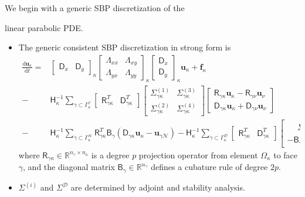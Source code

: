 \documentclass[final]{beamer}
\newlength{\firstcolwid}
\newcommand{\fnc}[1]{\ensuremath{\mathcal{#1}}}
\newcommand{\mat}[1]{\ensuremath{\mathsf{#1}}}
\newcommand{\mr}[1]{\mathrm{#1}}
\newcommand{\diff}[0]{\mr{d}}
\renewcommand{\H}[0]{\mat{H}}
\newcommand{\Hk}[0]{\H_{\kappa}}
\newcommand{\Dx}[0]{\mat{D}_{x}}
\newcommand{\Dy}[0]{\mat{D}_{y}}
\newcommand{\B}[0]{\mat{B}}
\newcommand{\Bg}[0]{\mat{B}_{\gamma}}
\newcommand{\Sig}[0]{\mat{\Sigma}}
\newcommand{\Lam}[0]{\mat{\Lambda}}
\newcommand{\Lamxx}[0]{\Lam_{xx}}
\newcommand{\Lamxy}[0]{\Lam_{xy}}
\newcommand{\Lamyx}[0]{\Lam_{yx}}
\newcommand{\Lamyy}[0]{\Lam_{yy}}
\newcommand{\Rgk}[0]{\mat{R}_{\gamma\kappa}}
\newcommand{\Rgn}[0]{\mat{R}_{\gamma\nu}}
\newcommand{\Dgk}[0]{\mat{D}_{\gamma\kappa}}
\newcommand{\Dgn}[0]{\mat{D}_{\gamma\nu}}
\newcommand{\Ukp}[0]{\bm{u}_\kappa}
\newcommand{\Unu}[0]{\bm{u}_\nu}
\newcommand{\Siggk}[1]{\Sig_{\gamma\kappa}^{(#1)}}
\newcommand{\phnt}[1]{\phantom{#1}}
\begin{document}
\begin{frame}[t]
\begin{columns}[t]
\begin{column}{\firstcolwid}
\begin{alertblock}{We begin with a generic SBP discretization of the 
        
        linear parabolic PDE.}
\begin{itemize}
    \item The generic consistent SBP discretization in strong form is
    \small
    \begin{equation*}\label{eq:parabolic_SBP}
    \begin{aligned}
    \frac{\diff \bm{u}_{\kappa}}{\diff t} =&  \begin{bmatrix} \Dx & \Dy \end{bmatrix}_{\kappa}
    \begin{bmatrix} \Lamxx & \Lamxy \\ \Lamyx & \Lamyy \end{bmatrix}_{\kappa}
    \begin{bmatrix} \Dx \\ \Dy \end{bmatrix}_{\kappa}\bm{u}_{\kappa} + \bm{f}_\kappa \\ 
    -&\Hk^{-1}\sum_{\gamma \subset \Gamma_\kappa^\fnc{I}}
    \begin{bmatrix} \Rgk^T & \Dgk^T \end{bmatrix}
    \begin{bmatrix} \Siggk{1} & \Siggk{3} \\ \Siggk{2} & \Siggk{4} \end{bmatrix} 
    \begin{bmatrix} \Rgk\Ukp - \Rgn\Unu \\ \Dgk\Ukp + \Dgn\Unu \end{bmatrix} \\
    -&\Hk^{-1}\sum_{\gamma \subset \Gamma_\kappa^{\fnc{N}}} \Rgk^{T}\B_{\gamma} (\Dgk \Ukp - \bm{u}_{\gamma {\fnc{N}}})
    -\Hk^{-1}\sum_{\gamma \subset \Gamma_\kappa^{\fnc{D}}}
    \begin{bmatrix} \Rgk^T & \Dgk^T \end{bmatrix}
    \begin{bmatrix} \phnt{-}\Sig_{\gamma}^{\fnc{D}} \\ -\Bg \end{bmatrix}
    (\Rgk \Ukp -\bm{u}_{\gamma {\fnc{D}}}).
    \end{aligned}
    \end{equation*}
    \normalfont
    where $\Rgk \in \mathbb{R}^{n_{\gamma}\times n_{\kappa}}$ is a
    degree $p$ projection operator from element $\Omega_\kappa$ to face $\gamma$, and the diagonal matrix $\Bg\in\mathbb{R}^{n_\gamma}$ defines a cubature rule of degree $2p$.
    \item $\Sig^{(i)}$ and $\Sig^{\fnc{D}}$ are determined by adjoint and stability analysis.
\end{itemize}
\end{alertblock}


\end{column}
\end{columns}
\end{frame}
\end{document}
